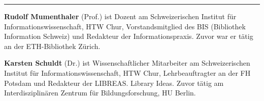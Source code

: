\begin{center}\rule{0.5\linewidth}{\linethickness}\end{center}

\textbf{Rudolf Mumenthaler} (Prof.) ist Dozent am Schweizerischen
Institut für Informationswissenschaft, HTW Chur, Vorstandsmitglied des
BIS (Bibliothek Information Schweiz) und Redakteur der
Informationspraxis. Zuvor war er tätig an der ETH-Bibliothek Zürich.

\textbf{Karsten Schuldt} (Dr.) ist Wissenschaftlicher Mitarbeiter am
Schweizerischen Institut für Informationswissenschaft, HTW Chur,
Lehrbeauftragter an der FH Potsdam und Redakteur der LIBREAS. Library
Ideas. Zuvor tätig am Interdisziplinären Zentrum für Bildungsforschung,
HU Berlin.
